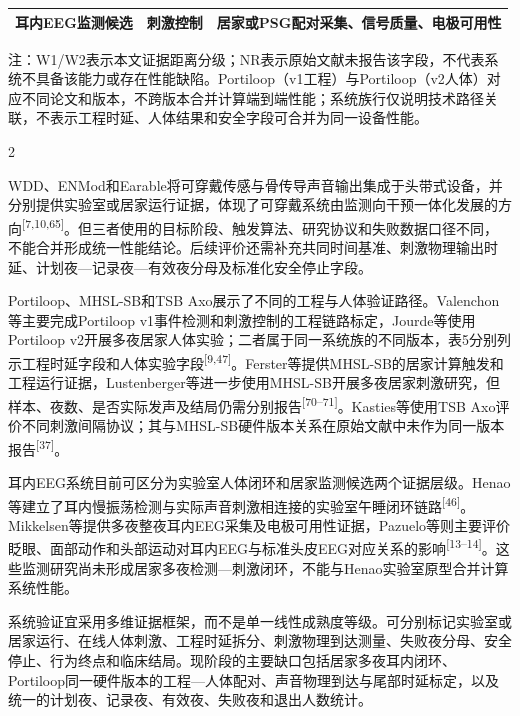 \documentclass[UTF8,zihao=5,fontset=none]{ctexart}
\newcommand{\refcite}[1]{\nolinebreak[4]\textsuperscript{[#1]}}
\begin{document}
\begin{center}
\begin{minipage}{\textwidth}
\begin{tabularx}{\textwidth}{>{\raggedright\arraybackslash}p{}>{\raggedright\arraybackslash}X>{\raggedright\arraybackslash}X}
耳内EEG监测候选 & 刺激控制 & 居家或PSG配对采集、信号质量、电极可用性 \\

\hline

\end{tabularx}

{\raggedright\fontsize{7.2pt}{8.6pt}\selectfont 注：W1/W2表示本文证据距离分级；NR表示原始文献未报告该字段，不代表系统不具备该能力或存在性能缺陷。Portiloop（v1工程）与Portiloop（v2人体）对应不同论文和版本，不跨版本合并计算端到端性能；系统族行仅说明技术路径关联，不表示工程时延、人体结果和安全字段可合并为同一设备性能。\par}

\end{minipage}
\end{center}

\begin{multicols}{2}

WDD、ENMod和Earable将可穿戴传感与骨传导声音输出集成于头带式设备，并分别提供实验室或居家运行证据，体现了可穿戴系统由监测向干预一体化发展的方向\refcite{7,10,65}。但三者使用的目标阶段、触发算法、研究协议和失败数据口径不同，不能合并形成统一性能结论。后续评价还需补充共同时间基准、刺激物理输出时延、计划夜—记录夜—有效夜分母及标准化安全停止字段。\par

Portiloop、MHSL-SB和TSB Axo展示了不同的工程与人体验证路径。Valenchon等主要完成Portiloop v1事件检测和刺激控制的工程链路标定，Jourde等使用Portiloop v2开展多夜居家人体实验；二者属于同一系统族的不同版本，表5分别列示工程时延字段和人体实验字段\refcite{9,47}。Ferster等提供MHSL-SB的居家计算触发和工程运行证据，Lustenberger等进一步使用MHSL-SB开展多夜居家刺激研究，但样本、夜数、是否实际发声及结局仍需分别报告\refcite{70--71}。Kasties等使用TSB Axo评价不同刺激间隔协议；其与MHSL-SB硬件版本关系在原始文献中未作为同一版本报告\refcite{37}。\par

耳内EEG系统目前可区分为实验室人体闭环和居家监测候选两个证据层级。Henao等建立了耳内慢振荡检测与实际声音刺激相连接的实验室午睡闭环链路\refcite{46}。Mikkelsen等提供多夜整夜耳内EEG采集及电极可用性证据，Pazuelo等则主要评价眨眼、面部动作和头部运动对耳内EEG与标准头皮EEG对应关系的影响\refcite{13--14}。这些监测研究尚未形成居家多夜检测—刺激闭环，不能与Henao实验室原型合并计算系统性能。\par

系统验证宜采用多维证据框架，而不是单一线性成熟度等级。可分别标记实验室或居家运行、在线人体刺激、工程时延拆分、刺激物理到达测量、失败夜分母、安全停止、行为终点和临床结局。现阶段的主要缺口包括居家多夜耳内闭环、Portiloop同一硬件版本的工程—人体配对、声音物理到达与尾部时延标定，以及统一的计划夜、记录夜、有效夜、失败夜和退出人数统计。\par


\end{multicols}
\end{document}
